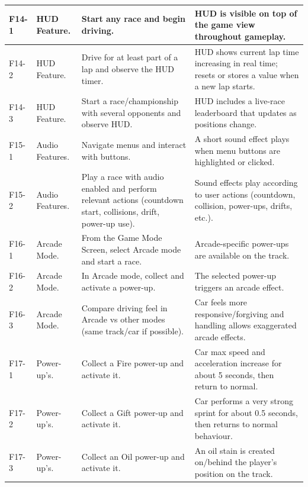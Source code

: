 \documentclass[12pt]{article}
\begin{document}
\begin{longtable}{|l|p{}|p{}|p{}|}
F14-1 & HUD Feature. &
Start any race and begin driving. &
HUD is visible on top of the game view throughout gameplay. \\
\hline

F14-2 & HUD Feature. &
Drive for at least part of a lap and observe the HUD timer. &
HUD shows current lap time increasing in real time; resets or stores a value when a new lap starts. \\
\hline

F14-3 & HUD Feature. &
Start a race/championship with several opponents and observe HUD. &
HUD includes a live-race leaderboard that updates as positions change. \\
\hline

F15-1 & Audio Features. &
Navigate menus and interact with buttons. &
A short sound effect plays when menu buttons are highlighted or clicked. \\
\hline

F15-2 & Audio Features. &
Play a race with audio enabled and perform relevant actions (countdown start, collisions, drift, power-up use). &
Sound effects play according to user actions (countdown, collision, power-ups, drifts, etc.). \\
\hline

F16-1 & Arcade Mode. &
From the Game Mode Screen, select Arcade mode and start a race. &
Arcade-specific power-ups are available on the track. \\
\hline

F16-2 & Arcade Mode. &
In Arcade mode, collect and activate a power-up. &
The selected power-up triggers an arcade effect. \\
\hline

F16-3 & Arcade Mode. &
Compare driving feel in Arcade vs other modes (same track/car if possible). &
Car feels more responsive/forgiving and handling allows exaggerated arcade effects. \\
\hline

F17-1 & Power-up’s. &
Collect a Fire power-up and activate it. &
Car max speed and acceleration increase for about 5 seconds, then return to normal. \\
\hline

F17-2 & Power-up’s. &
Collect a Gift power-up and activate it. &
Car performs a very strong sprint for about 0.5 seconds, then returns to normal behaviour. \\
\hline

F17-3 & Power-up’s. &
Collect an Oil power-up and activate it. &
An oil stain is created on/behind the player’s position on the track. \\
\hline


\end{longtable}
\end{document}
